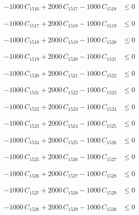\documentclass[a4paper,11pt]{article}
\begin{document}
\begin{align}
-1000\,C_{1516} + 2000\,C_{1517} - 1000\,C_{1518} &\leq 0 \nonumber
\end{align}

\begin{align}
-1000\,C_{1517} + 2000\,C_{1518} - 1000\,C_{1519} &\leq 0 \nonumber
\end{align}

\begin{align}
-1000\,C_{1518} + 2000\,C_{1519} - 1000\,C_{1520} &\leq 0 \nonumber
\end{align}

\begin{align}
-1000\,C_{1519} + 2000\,C_{1520} - 1000\,C_{1521} &\leq 0 \nonumber
\end{align}

\begin{align}
-1000\,C_{1520} + 2000\,C_{1521} - 1000\,C_{1522} &\leq 0 \nonumber
\end{align}

\begin{align}
-1000\,C_{1521} + 2000\,C_{1522} - 1000\,C_{1523} &\leq 0 \nonumber
\end{align}

\begin{align}
-1000\,C_{1522} + 2000\,C_{1523} - 1000\,C_{1524} &\leq 0 \nonumber
\end{align}

\begin{align}
-1000\,C_{1523} + 2000\,C_{1524} - 1000\,C_{1525} &\leq 0 \nonumber
\end{align}

\begin{align}
-1000\,C_{1524} + 2000\,C_{1525} - 1000\,C_{1526} &\leq 0 \nonumber
\end{align}

\begin{align}
-1000\,C_{1525} + 2000\,C_{1526} - 1000\,C_{1527} &\leq 0 \nonumber
\end{align}

\begin{align}
-1000\,C_{1526} + 2000\,C_{1527} - 1000\,C_{1528} &\leq 0 \nonumber
\end{align}

\begin{align}
-1000\,C_{1527} + 2000\,C_{1528} - 1000\,C_{1529} &\leq 0 \nonumber
\end{align}

\begin{align}
-1000\,C_{1528} + 2000\,C_{1529} - 1000\,C_{1530} &\leq 0 \nonumber
\end{align}
\end{document}
